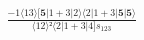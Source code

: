 \documentclass[varwidth, border=5pt]{standalone}
\begin{document}
\begin{my}
$\begin{gathered}
\scriptscriptstyle\frac{-1⟨13⟩[𝟓|1+3|2⟩⟨2|1+3|𝟓|𝟓⟩}{⟨12⟩²⟨2|1+3|4]s_{123}}
\end{gathered}$
\end{my}
\end{document}
